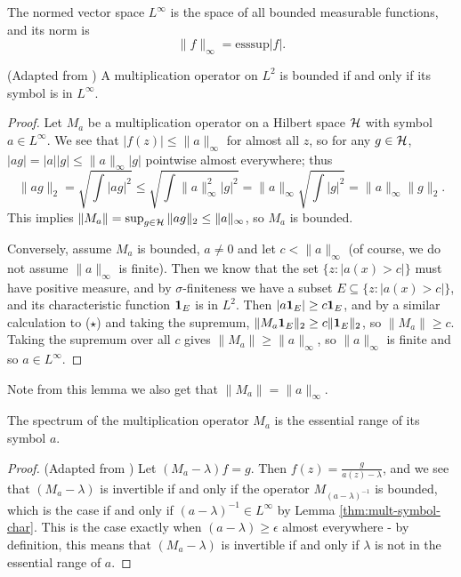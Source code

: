 \documentclass[../main.tex]{subfiles}
\begin{document}
The normed vector space $L^\infty$ is the space of all bounded measurable
functions, and its norm is
 $$\|f\|_\infty = \text{esssup}|f|.$$

\begin{lemma}
\label{thm:mult-symbol-char}
(Adapted from \cite{arveson2002short})
  A multiplication operator on $L^2$ is bounded if and only if its symbol is in
  $L^\infty$.
\end{lemma}
\begin{proof}
Let $M_a$ be a multiplication operator on a Hilbert space $\mathcal{H}$ with symbol
$a \in L^\infty$. We see that $|f(z)| \leq \|a\|_\infty$ for almost all
$z$, so for any $g \in \mathcal{H}$, $|a g| = |a||g| \leq \|a\|_\infty |g|$
pointwise almost everywhere; thus
\begin{equation*}
\|a g\|_2 = \sqrt{\int |a g|^2} \leq \sqrt{\int \|a\|_\infty^2|g|^2} 
	  = \|a\|_\infty \sqrt{\int |g|^2} = \|a\|_\infty \|g\|_2.
\tag{$\star$}
\end{equation*}
This implies $\|M_a\| = \sup_{g \in \mathcal{H}} \|a g\|_2 \leq \|a\|_\infty$, so $M_a$ is bounded.

Conversely, assume $M_a$ is bounded, $a \neq 0$ and let $c < \|a\|_\infty$ (of
course, we do not assume $\|a\|_\infty$ is finite). Then we know that
the set $\{z : |a(x) > c|\}$ must have positive measure, and by
$\sigma$-finiteness we have a subset $E \subseteq \{z : |a(x) > c|\}$,
and its characteristic 
function $\mathbf{1}_E$ is in $L^2$. Then $|a \mathbf{1}_E| \geq c \mathbf{1}_E$, and by a similar
calculation to ($\star$) and taking the supremum, $\|M_a  \mathbf{1}_E\|_2 \geq c
\|\mathbf{1}_E\|_2$, so $\|M_a\| \geq c$. Taking the supremum over all $c$ gives
$\|M_a\| \geq \|a\|_\infty$, so $\|a\|_\infty$ is finite and so $a \in
L^\infty$. \end{proof}

Note from this lemma we also get that $\|M_a\| = \|a\|_\infty$.

\begin{theorem}
  \label{thm:mult-op-spec}
  The spectrum of the multiplication operator $M_a$ is the essential range of its symbol $a$.
\end{theorem}
\begin{proof}
(Adapted from \cite{garcia2023operator})
Let $(M_a - \lambda)f = g$. Then $f(z) = \frac{g}{a(z) - \lambda}$, and we see
that $(M_a - \lambda)$ is invertible if and only if the operator 
$M_{(a - \lambda)^{-1}}$ is bounded, which is the case if and only if
$(a - \lambda)^{-1} \in L^\infty$ by Lemma \ref{thm:mult-symbol-char}.
This is the case exactly when $(a - \lambda) \geq \epsilon$ almost everywhere -
by definition, this means that $(M_a - \lambda)$ is invertible if and
only if $\lambda$ is not in the essential range of $a$.
\end{proof}
\end{document}
